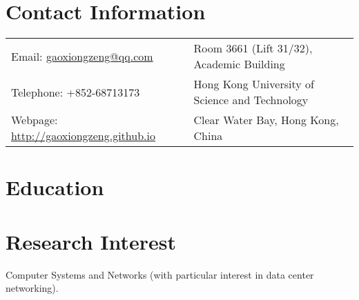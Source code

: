 \documentclass[10pt,a4paper,roman]{moderncv} %
\begin{document}
\makecvtitle %

\section{Contact Information}
\vspace{2mm}
\begin{tabular}{p{9cm} l}
Email: \href{mailto:gaoxiongzeng@qq.com}{gaoxiongzeng@qq.com} &  Room 3661 (Lift 31/32), Academic Building\\
Telephone: +852-68713173 & Hong Kong University of Science and Technology\\
Webpage: \textcolor{blue}{\url{http://gaoxiongzeng.github.io}} & Clear Water Bay, Hong Kong, China\\
\end{tabular}


\section{Education}
\vspace{2mm}
\vspace{3mm}


\section{Research Interest}
\vspace{2mm}
Computer Systems and Networks (with particular interest in data center networking).


\end{document}

